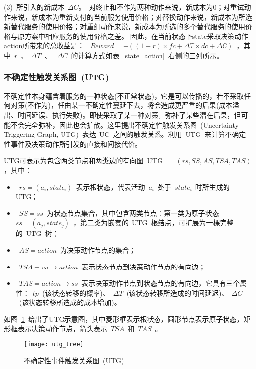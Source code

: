 (3)~所引入的新成本~$\Delta C$。~对终止和不作为两种动作来说，新成本为0；对重试动作来说，新成本为重新支付的当前服务使用价格；对替换动作来说，新成本为所选新替代服务的使用价格；对重组动作来说，新成本为所选的多个替代服务的使用价格与原方案中相应服务的使用价格之差。
因此，在当前状态下state采取决策动作action所带来的总收益是：
~$Reward =  - ((1 - r) \times fc + \Delta T \times dc + \Delta C)$~，其中~$r$~、~$\Delta T$~、 ~$\Delta C$~的计算方式如表~\ref{state_action}~右侧的三列所示。

\subsubsection{不确定性触发关系图~(UTG)~}
不确定性本身蕴含着服务的一种状态(不正常状态)，它是可以传播的，若不采取任何对策(不作为)，任由某一不确定性蔓延下去，将会造成更严重的后果(成本溢出、时间延误、执行失败)。即使采取了某一种对策，弥补了某些潜在后果，但可能不会完全弥补，因此也会扩散。这里提出不确定性触发关系图~(Uncertainty Triggering Graph, UTG)~表达~UC~之间的触发关系。利用~UTG~来计算不确定性事件及决策动作所引发的直接和间接代价。

UTG可表示为包含两类节点和两类边的有向图~UTG = ~$(rs, SS, AS, TSA, TAS)$，其中：
\begin{itemize}
\item ~$rs=(a_i, state_i)$~表示根状态，代表活动~$a_i$~处于~$state_i$~时所生成的UTG；
\item ~$SS={ss}$~为状态节点集合，其中包含两类节点：第一类为原子状态~$ss=(a_j, state_j)$~，第二类为嵌套的~UTG~根结点，可扩展为一棵完整的~UTG~树；
\item ~$AS={action}$~为决策动作节点的集合；
\item ~$TSA=ss \to action$~表示状态节点到决策动作节点的有向边；
\item ~$TAS=action \to ss$~表示决策动作节点到状态节点的有向边，它具有三个属性：~$tp$~(该状态转移的概率)、~$\Delta T$~(该状态转移所造成的时间延迟)、~$\Delta C$~(该状态转移所造成的成本增加)。
\end{itemize}

如图~\ref{utg_tree}~给出了UTG示意图，其中菱形框表示根状态，圆形节点表示原子状态，矩形框表示决策动作节点，箭头表示~$TSA$~和~$TAS$~。

\begin{figure}[htbp]
    \centering
    \texttt{[image: utg\_tree]}
    \caption{不确定性事件触发关系图~(UTG)~}\label{utg_tree}
    \vspace{-1em}
\end{figure}

